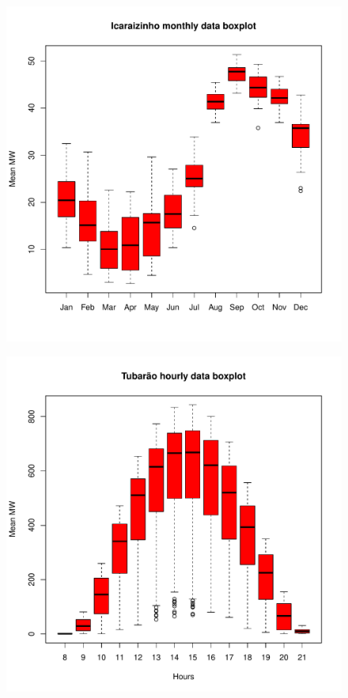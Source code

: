 \begin{figure}
  \centering
  \begin{minipage}[t]{\linewidth}
    
    \begin{minipage}[t]{0.45\linewidth}
       \includegraphics[width=\textwidth]{./Figuras/Icaraizinho/icaraizinho-boxplot}
      	\label{fig:icaraizinho-boxplot}
    \end{minipage}
    \begin{minipage}[t]{0.45\linewidth}
       \includegraphics[width=\textwidth]{./Figuras/Solar-exemplos/tubarao-boxplot}

\end{minipage}
\end{minipage}
\end{figure}
